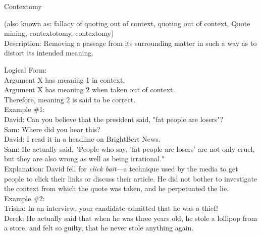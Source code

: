 \documentclass[a4paper,12pt,single,pdftex]{scrbook}
\begin{document}
Contextomy
    
      (also known as: fallacy of quoting out of context, quoting out of context, Quote mining, contextotomy, contextomy)
    \\

  
    Description: Removing a passage from its surrounding matter in such a way as to distort its intended meaning.

    
      Logical Form:
    \\

    
      Argument X has meaning 1 in context.
    \\

    
      Argument X has meaning 2 when taken out of context.
    \\

    
      Therefore, meaning 2 is said to be correct.
    \\

    
      Example \#1:
    \\

    
      David: Can you believe that the president said, "fat people are losers"?
    \\

    
      Sam: Where did you hear this?
    \\

    
      David: I read it in a headline on BrightBert News.
    \\

    
      Sam: He actually said, "People who say, 'fat people are losers' are not only cruel, but they are also wrong as well as being irrational."
    \\

    
      Explanation: David fell for {\it click bait}—a technique used by the media to get people to click their links or discuss their article. He did not bother to investigate the context from which the quote was taken, and he perpetuated the lie.
    \\

    
      Example \#2:
    \\

    
      Trisha: In an interview, your candidate admitted that he was a thief!
    \\

    
      Derek: He actually said that when he was three years old, he stole a lollipop from a store, and felt so guilty, that he never stole anything again.
    \\
\end{document}
